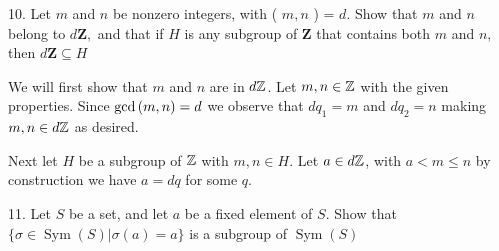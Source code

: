 \newpage
\begin{mdframed}[style=darkQuesion]
10. Let $m$ and $n$ be nonzero integers, with ( $m, n$ ) = $d$. Show that $m$ and $n$ belong to $d \mathbf{Z},$ and that if $H$ is any subgroup of $\mathbf{Z}$ that contains both $m$ and $n,$ then $d \mathbf{Z} \subseteq H$
\end{mdframed}

\begin{mdframed}[style=darkAnswer,frametitle={Joe Starr}]
We will first show that $m$ and $n$ are in $d\mathbb{Z}$. Let $m,n\in \mathbb{Z}$ with the given
properties. Since $\gcd\left(m,n\right)=d$ we observe that $dq_1=m$ and $dq_2=n$
making $m,n\in d\mathbb{Z}$ as desired.

Next let $H$ be a subgroup of $\mathbb{Z}$ with $m,n\in H$. Let $a\in d\mathbb{Z}$, with
$a<m\leq n$ by construction we have $a=dq$ for some $q$.
\end{mdframed}
\newpage
\begin{mdframed}[style=darkQuesion]
11. Let $S$ be a set, and let $a$ be a fixed element of $S .$ Show that $\{\sigma \in \operatorname{Sym}(S) | \sigma(a)=a\}$ is a subgroup of $\operatorname{Sym}(S)$

\end{mdframed}

